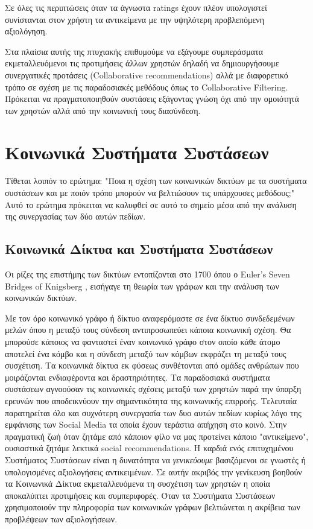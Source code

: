 Σε όλες τις περιπτώσεις όταν τα άγνωστα ratings έχουν πλέον υπολογιστεί συνίστανται στον χρήστη τα αντικείμενα με την υψηλότερη προβλεπόμενη αξιολόγηση.
 
Στα πλαίσια αυτής της πτυχιακής επιθυμούμε να εξάγουμε συμπεράσματα εκμεταλλευόμενοι τις προτιμήσεις άλλων χρηστών δηλαδή 
να δημιουργήσουμε συνεργατικές προτάσεις  (Collaborative recommendations)  αλλά
με διαφορετικό τρόπο σε σχέση με τις παραδοσιακές μεθόδους όπως το Collaborative Filtering. 
Πρόκειται να πραγματοποιηθούν συστάσεις εξάγοντας γνώση όχι από την ομοιότητά των χρηστών αλλά από την κοινωνική τους διασύνδεση.


\section{Κοινωνικά Συστήματα Συστάσεων}
\noindent
Τίθεται λοιπόν το ερώτημα: "Ποια η σχέση των κοινωνικών δικτύων με τα συστήματα συστάσεων και με ποιόν τρόπο μπορούν να βελτιώσουν τις υπάρχουσες μεθόδους;"
Αυτό το ερώτημα πρόκειται να καλυφθεί σε αυτό το σημείο μέσα από την ανάλυση της συνεργασίας των δύο αυτών πεδίων.

\subsection{Κοινωνικά Δίκτυα και Συστήματα Συστάσεων}
\noindent
Οι ρίζες της επιστήμης των δικτύων εντοπίζονται στο 1700 όπου ο Euler’s Seven Bridges of Knigsberg \cite{Euler41}, 
εισήγαγε τη θεωρία των γράφων και την ανάλυση των κοινωνικών δικτύων. 

Με τον όρο κοινωνικό γράφο ή δίκτυο αναφερόμαστε σε ένα δίκτυο συνδεδεμένων μελών όπου η μεταξύ τους σύνδεση αντιπροσωπεύει κάποια κοινωνική σχέση. 
Θα μπορούσε κάποιος να φανταστεί έναν κοινωνικό γράφο στον οποίο κάθε άτομο αποτελεί ένα κόμβο και η σύνδεση μεταξύ των κόμβων εκφράζει τη μεταξύ τους συσχέτιση. 
Τα κοινωνικά δίκτυα εκ φύσεως συνθέτονται από ομάδες ανθρώπων που μοιράζονται ενδιαφέροντα και δραστηριότητες. 
Τα παραδοσιακά συστήματα συστάσεων αγνοούσαν τις κοινωνικές σχέσεις μεταξύ των χρηστών παρά την ύπαρξη ερευνών που αποδεικνύουν την σημαντικότητα της κοινωνικής επιρροής.
Τελευταία παρατηρείται όλο και συχνότερη συνεργασία των δυο αυτών πεδίων κυρίως λόγο της εμφάνισης των Social Media τα οποία έχουν τεράστια απήχηση στο κοινό.\cite{SNRSWCFS}
Στην πραγματική ζωή όταν ζητάμε από κάποιον φίλο να μας προτείνει κάποιο "αντικείμενο", ουσιαστικά ζητάμε λεκτικά  social recommendations. 
Η καρδιά ενός επιτυχημένου Συστήματος Συστάσεων είναι η δυνατότητα να \emph{γενικεύουμε} βασιζόμενοι σε γνωστές ή υπολογισμένες αξιολογήσεις αντικειμένων.
Σε αυτήν ακριβός την γενίκευση βοηθούν τα Κοινωνικά Δίκτυα εκμεταλλευόμενα τη συσχέτιση των χρηστών η οποία αποκαλύπτει προτιμήσεις και συμπεριφορές.
Όταν τα Συστήματα Συστάσεων χρησιμοποιούν την πληροφορία των κοινωνικών γράφων βελτιώνεται η ακρίβεια των προβλέψεων των αξιολογήσεων.
\cite{RSwithSreg}

